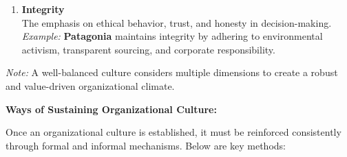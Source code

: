 \documentclass[10pt,a4paper]{book}
\begin{document}
\begin{enumerate}
    \item \textbf{Integrity} \\
    The emphasis on ethical behavior, trust, and honesty in decision-making. \\
    \textit{Example:} \textbf{Patagonia} maintains integrity by adhering to environmental activism, transparent sourcing, and corporate responsibility.
\end{enumerate}

\textit{Note:} A well-balanced culture considers multiple dimensions to create a robust and value-driven organizational climate.

\vspace{0.5cm}

\textbf{Ways of Sustaining Organizational Culture:}

Once an organizational culture is established, it must be reinforced consistently through formal and informal mechanisms. Below are key methods:
\end{document}
